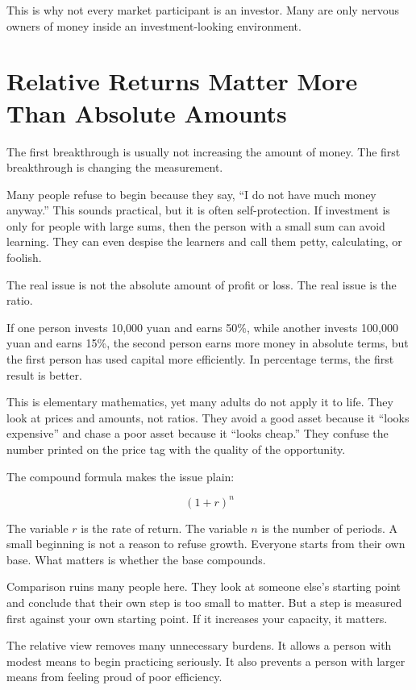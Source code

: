 This is why not every market participant is an investor. Many are only nervous owners of money inside an investment-looking environment.

\section*{Relative Returns Matter More Than Absolute Amounts}

The first breakthrough is usually not increasing the amount of money. The first breakthrough is changing the measurement.

Many people refuse to begin because they say, ``I do not have much money anyway.'' This sounds practical, but it is often self-protection. If investment is only for people with large sums, then the person with a small sum can avoid learning. They can even despise the learners and call them petty, calculating, or foolish.

The real issue is not the absolute amount of profit or loss. The real issue is the ratio.

If one person invests 10,000 yuan and earns 50\%, while another invests 100,000 yuan and earns 15\%, the second person earns more money in absolute terms, but the first person has used capital more efficiently. In percentage terms, the first result is better.

This is elementary mathematics, yet many adults do not apply it to life. They look at prices and amounts, not ratios. They avoid a good asset because it ``looks expensive'' and chase a poor asset because it ``looks cheap.'' They confuse the number printed on the price tag with the quality of the opportunity.

The compound formula makes the issue plain:

\[
(1+r)^n
\]

The variable \(r\) is the rate of return. The variable \(n\) is the number of periods. A small beginning is not a reason to refuse growth. Everyone starts from their own base. What matters is whether the base compounds.

Comparison ruins many people here. They look at someone else's starting point and conclude that their own step is too small to matter. But a step is measured first against your own starting point. If it increases your capacity, it matters.

The relative view removes many unnecessary burdens. It allows a person with modest means to begin practicing seriously. It also prevents a person with larger means from feeling proud of poor efficiency.

